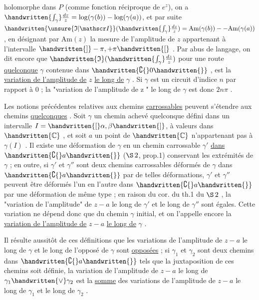 holomorphe dans $P$ (comme fonction réciproque de $e^z$), on a $\handwritten{\int_\gamma}\frac{dz}{z}=\log(\gamma(b))-\log(\gamma(a))$, et par suite $\handwritten{\unsure{\mathfrak I|\mathscr I}}(\handwritten{\int_\gamma}\frac{dz}{z})=\mathrm{Am}(\gamma(b))--\mathrm{Am}(\gamma(a))$, en désignant par $\mathrm{Am}(z)$ la mesure de l'amplitude de $z$ appartenant à l'intervalle $\handwritten{]}-\pi,+\pi\handwritten{[}$ . Par abus de langage, on dit encore que $\handwritten{\mathfrak I}(\handwritten{\int_\gamma}\frac{dz}{z})$ pour une route \uline{quelconque} $\gamma$ contenue dans $\handwritten{\complement\{}0\handwritten{\}}$ , est la \uline{variation de l'amplitude de} $z$ \uline{le long de} $\gamma$ . Si $\gamma$ est un circuit d'indice $n$ par rapport à 0 ; la "variation de l'amplitude de z " le long de $\gamma$ est donc $2n\pi$ .

Les notions précédentes relatives aux chemins \uline{carrossables} peuvent s'étendre aux chemins \uline{quelconques} . Soit $\gamma$ un chemin achevé quelconque défini dans un intervalle $I=\handwritten{[}\alpha,\beta\handwritten{]}$, à valeurs dans $\handwritten{\mathbb C}$ , et soit $a$ un point de $\handwritten{\mathbb C}$ n'appartenant pas à $\gamma(I)$ . Il existe une déformation de $\gamma$ en un chemin carrossable $\gamma'$ \uline{dans} $\handwritten{\complement\{}a\handwritten{\}}$ ($\S\,2$, prop.1) conservant les extrémités de $\gamma$ ; en outre, si $\gamma'$ et $\gamma''$ sont deux chemins carrossables déformés de $\gamma$ dans $\handwritten{\complement\{}a\handwritten{\}}$ par de telles déformations, $\gamma'$ et $\gamma''$ peuvent être déformés l'un en l'autre dans $\handwritten{\complement\{}a\handwritten{\}}$ par une déformation de même type ; en raison du cor. du th.1 du $\S\,2$ , la "variation de l'amplitude" de $z-a$ le long de $\gamma'$ et le long de $\gamma''$ sont égales. Cette variation ne dépend donc que du chemin $\gamma$ initial, et on l'appelle encore la \uline{variation de l'amplitude de} $z-a$ \uline{le long de} $\gamma$ .
\margin{\handwritten{$\bigl(\ \big|$}}

Il résulte aussitôt de ces définitions que les variations de l'amplitude de $z-a$ le long de $\gamma$ et le long de l'opposé de $\gamma$ sont \uline{opposées} ; si $\gamma_1$ et $\gamma_2$ sont deux chemins dans $\handwritten{\complement\{}a\handwritten{\}}$ tels que la juxtaposition de ces chemins soit définie, la variation de l'amplitude de $z-a$ le long de $\gamma_1\handwritten{\vee}\gamma_2$ est la \uline{somme} des variations de l'amplitude de $z-a$ le long de $\gamma_1$ et le long de $\gamma_2$ .
